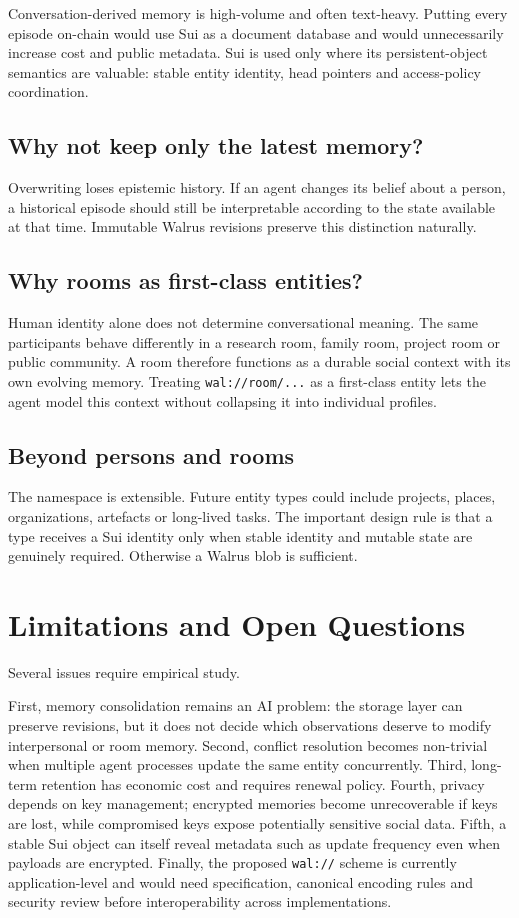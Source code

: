 \documentclass[11pt]{article}
\begin{document}
Conversation-derived memory is high-volume and often text-heavy. Putting every episode on-chain would use Sui as a document database and would unnecessarily increase cost and public metadata. Sui is used only where its persistent-object semantics are valuable: stable entity identity, head pointers and access-policy coordination.

\subsection{Why not keep only the latest memory?}

Overwriting loses epistemic history. If an agent changes its belief about a person, a historical episode should still be interpretable according to the state available at that time. Immutable Walrus revisions preserve this distinction naturally.

\subsection{Why rooms as first-class entities?}

Human identity alone does not determine conversational meaning. The same participants behave differently in a research room, family room, project room or public community. A room therefore functions as a durable social context with its own evolving memory. Treating \texttt{wal://room/...} as a first-class entity lets the agent model this context without collapsing it into individual profiles.

\subsection{Beyond persons and rooms}

The namespace is extensible. Future entity types could include projects, places, organizations, artefacts or long-lived tasks. The important design rule is that a type receives a Sui identity only when stable identity and mutable state are genuinely required. Otherwise a Walrus blob is sufficient.

\section{Limitations and Open Questions}

Several issues require empirical study.

First, memory consolidation remains an AI problem: the storage layer can preserve revisions, but it does not decide which observations deserve to modify interpersonal or room memory. Second, conflict resolution becomes non-trivial when multiple agent processes update the same entity concurrently. Third, long-term retention has economic cost and requires renewal policy. Fourth, privacy depends on key management; encrypted memories become unrecoverable if keys are lost, while compromised keys expose potentially sensitive social data. Fifth, a stable Sui object can itself reveal metadata such as update frequency even when payloads are encrypted. Finally, the proposed \texttt{wal://} scheme is currently application-level and would need specification, canonical encoding rules and security review before interoperability across implementations.
\end{document}
